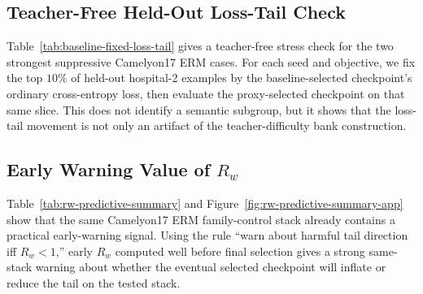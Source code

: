 \begin{table}[h]
  \centering
  \scriptsize
  \resizebox{\columnwidth}{!}{}
  \caption{
    Generalized cross-entropy (GCE, $q=0.7$) extension on Camelyon17 ERM, ten seeds.
    Negative $\Delta$GCE proxy means the GCE objective-aligned validation score improves.
    The same-trajectory comparison is GCE proxy-best minus GCE validation-loss-best; all three contrasts worsen held-out loss, ECE, and teacher-tail in $10/10$ seeds.
    Epochs report mean selected epoch for the first and second policy in each contrast.
  }
  \label{tab:gce-q07-extension}
\end{table}

\subsection{Teacher-Free Held-Out Loss-Tail Check}
Table~\ref{tab:baseline-fixed-loss-tail} gives a teacher-free stress check for the two strongest suppressive Camelyon17 ERM cases.
For each seed and objective, we fix the top $10\%$ of held-out hospital-2 examples by the baseline-selected checkpoint's ordinary cross-entropy loss, then evaluate the proxy-selected checkpoint on that same slice.
This does not identify a semantic subgroup, but it shows that the loss-tail movement is not only an artifact of the teacher-difficulty bank construction.

\begin{table}[h]
  \centering
  \small
  \resizebox{\columnwidth}{!}{}
  \caption{
    Teacher-free held-out loss-tail check on Camelyon17 ERM.
    The fixed loss-tail is the top decile of hospital-2 examples by ordinary cross-entropy under the corresponding baseline-selected checkpoint; the same fixed slice is then evaluated under the proxy-selected suppressive checkpoint.
    Intervals are paired 95\% bootstrap intervals over ten seeds.
  }
  \label{tab:baseline-fixed-loss-tail}
\end{table}

\subsection{Early Warning Value of $R_w$}
Table~\ref{tab:rw-predictive-summary} and Figure~\ref{fig:rw-predictive-summary-app} show that the same Camelyon17 ERM family-control stack already contains a practical early-warning signal.
Using the rule ``warn about harmful tail direction iff $R_w<1$,'' early $R_w$ computed well before final selection gives a strong same-stack warning about whether the eventual selected checkpoint will inflate or reduce the tail on the tested stack.

